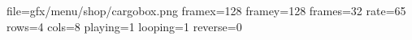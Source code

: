 file=gfx/menu/shop/cargobox.png
framex=128
framey=128
frames=32
rate=65
rows=4
cols=8
playing=1
looping=1
reverse=0

